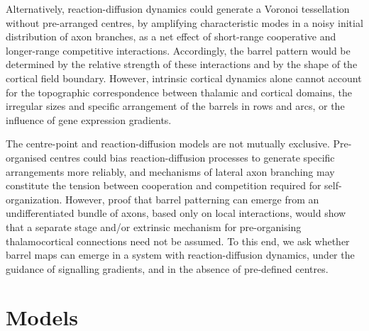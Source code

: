 \documentclass[9pt,twocolumn,twoside,lineno]{pnas-new}
\begin{document}
Alternatively, reaction-diffusion dynamics could generate a Voronoi tessellation without pre-arranged centres, by amplifying characteristic modes in a noisy initial distribution of axon branches, as a net effect of short-range cooperative and longer-range competitive interactions. Accordingly, the barrel pattern would be determined by the relative strength of these interactions and by the shape of the cortical field boundary. However, intrinsic cortical dynamics alone cannot account for the topographic correspondence between thalamic and cortical domains, the irregular sizes and specific arrangement of the barrels in rows and arcs, or the influence of gene expression gradients.

The centre-point and reaction-diffusion models are not mutually exclusive. Pre-organised centres could bias reaction-diffusion processes to generate specific  arrangements more reliably, and mechanisms of lateral axon branching may constitute the tension between cooperation and competition required for self-organization. However, proof that barrel patterning can emerge from an undifferentiated bundle of  axons, based only on local interactions, would show that a separate stage and/or extrinsic mechanism for pre-organising thalamocortical connections need not be assumed. To this end, we ask whether barrel maps can emerge in a system with reaction-diffusion dynamics, under the guidance of signalling gradients, and in the absence of pre-defined centres.


\section*{Models}
\end{document}
